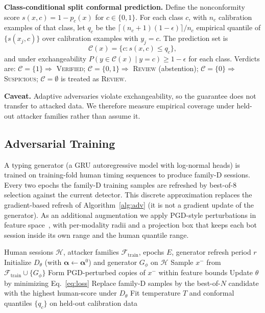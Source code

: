 \documentclass[conference]{IEEEtran}
\begin{document}
\textbf{Class-conditional split conformal prediction.} Define the nonconformity score $s(x,c)=1-p_c(x)$ for $c\in\{0,1\}$. For each class $c$, with $n_c$ calibration examples of that class, let $q_c$ be the $\lceil (n_c{+}1)(1{-}\epsilon)\rceil/n_c$ empirical quantile of $\{s(x_j,c)\}$ over calibration examples with $y_j=c$. The prediction set is
\begin{equation}
\mathcal{C}(x)=\{c: s(x,c)\le q_c\},
\end{equation}
and under exchangeability $P(y\in\mathcal{C}(x)\mid y{=}c)\ge 1-\epsilon$ for each class. Verdicts are:
$\mathcal{C}=\{1\}\Rightarrow$ \textsc{Verified};
$\mathcal{C}=\{0,1\}\Rightarrow$ \textsc{Review} (abstention);
$\mathcal{C}=\{0\}\Rightarrow$ \textsc{Suspicious};
$\mathcal{C}=\emptyset$ is treated as \textsc{Review}.

\textbf{Caveat.} Adaptive adversaries violate exchangeability, so the guarantee does not transfer to attacked data. We therefore measure empirical coverage under held-out attacker families rather than assume it.

\subsection{Adversarial Training}
A typing generator (a GRU autoregressive model with log-normal heads) is trained on training-fold human timing sequences to produce family-D sessions. Every two epochs the family-D training samples are refreshed by best-of-8 selection against the current detector. This discrete approximation replaces the gradient-based refresh of Algorithm~\ref{alg:adv} (it is not a gradient update of the generator). As an additional augmentation we apply PGD-style perturbations in feature space~\cite{madry2018}, with per-modality radii and a projection box that keeps each bot session inside its own range and the human quantile range.

\begin{algorithm}[t]
\caption{Adversarial training of habitID-Net}
\label{alg:adv}
\begin{algorithmic}[1]
\Require Human sessions $\mathcal{H}$, attacker families $\mathcal{F}_{\text{train}}$, epochs $E$, generator refresh period $r$
\State Initialize $D_\theta$ (with $\boldsymbol{\alpha}\gets\boldsymbol{\alpha}^0$) and generator $G_\phi$ on $\mathcal{H}$
    \State Sample $x^-$ from $\mathcal{F}_{\text{train}}\cup\{G_\phi\}$
    \State Form PGD-perturbed copies of $x^-$ within feature bounds
    \State Update $\theta$ by minimizing Eq.~\eqref{eq:loss}
  \EndFor
   \State Replace family-D samples by the best-of-$N$ candidate with the highest human-score under $D_\theta$ \EndIf
\EndFor
\State Fit temperature $T$ and conformal quantiles $\{q_c\}$ on held-out calibration data
\end{algorithmic}
\end{algorithm}
\end{document}
